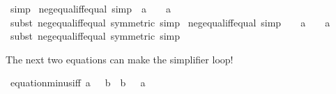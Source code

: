\begin{isabellebody}
\ simp\isanewline
{}\isamarkupfalse%
%
\endisatagproof
{\isafoldproof}%
%
\isadelimproof
\isanewline
%
\endisadelimproof
\isanewline
{}\isamarkupfalse%
\ neg{\isacharunderscore}{\kern0pt}equal{\isacharunderscore}{\kern0pt}{}{\isacharunderscore}{\kern0pt}iff{\isacharunderscore}{\kern0pt}equal\ {\isacharbrackleft}{\kern0pt}simp{\isacharbrackright}{\kern0pt}{\isacharcolon}{\kern0pt}\ {\isachardoublequoteopen}{\isacharminus}{\kern0pt}\ a\ {\isacharequal}{\kern0pt}\ {}\ {\isasymlongleftrightarrow}\ a\ {\isacharequal}{\kern0pt}\ {}{\isachardoublequoteclose}\isanewline
%
\isadelimproof
\ \ %
\endisadelimproof
%
\isatagproof
{}\isamarkupfalse%
\ {\isacharparenleft}{\kern0pt}subst\ neg{\isacharunderscore}{\kern0pt}equal{\isacharunderscore}{\kern0pt}iff{\isacharunderscore}{\kern0pt}equal\ {\isacharbrackleft}{\kern0pt}symmetric{\isacharbrackright}{\kern0pt}{\isacharparenright}{\kern0pt}\ simp%
\endisatagproof
{\isafoldproof}%
%
\isadelimproof
\isanewline
%
\endisadelimproof
\isanewline
{}\isamarkupfalse%
\ neg{\isacharunderscore}{\kern0pt}{}{\isacharunderscore}{\kern0pt}equal{\isacharunderscore}{\kern0pt}iff{\isacharunderscore}{\kern0pt}equal\ {\isacharbrackleft}{\kern0pt}simp{\isacharbrackright}{\kern0pt}{\isacharcolon}{\kern0pt}\ {\isachardoublequoteopen}{}\ {\isacharequal}{\kern0pt}\ {\isacharminus}{\kern0pt}\ a\ {\isasymlongleftrightarrow}\ {}\ {\isacharequal}{\kern0pt}\ a{\isachardoublequoteclose}\isanewline
%
\isadelimproof
\ \ %
\endisadelimproof
%
\isatagproof
{}\isamarkupfalse%
\ {\isacharparenleft}{\kern0pt}subst\ neg{\isacharunderscore}{\kern0pt}equal{\isacharunderscore}{\kern0pt}iff{\isacharunderscore}{\kern0pt}equal\ {\isacharbrackleft}{\kern0pt}symmetric{\isacharbrackright}{\kern0pt}{\isacharparenright}{\kern0pt}\ simp%
\endisatagproof
{\isafoldproof}%
%
\isadelimproof
%
\endisadelimproof
%
\begin{isamarkuptext}%
The next two equations can make the simplifier loop!%
\end{isamarkuptext}\isamarkuptrue%
\isamarkupfalse%
\ equation{\isacharunderscore}{\kern0pt}minus{\isacharunderscore}{\kern0pt}iff{\isacharcolon}{\kern0pt}\ {\isachardoublequoteopen}a\ {\isacharequal}{\kern0pt}\ {\isacharminus}{\kern0pt}\ b\ {\isasymlongleftrightarrow}\ b\ {\isacharequal}{\kern0pt}\ {\isacharminus}{\kern0pt}\ a{\isachardoublequoteclose}\isanewline
%
\isadelimproof
%
\endisadelimproof
%
\isatagproof
{}\isamarkupfalse%
\ {\isacharminus}{\kern0pt}\isanewline

\end{isabellebody}
